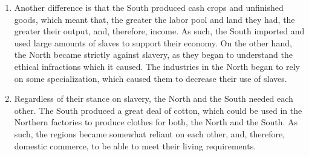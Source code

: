\documentclass[12pt]{article}
\begin{document}
\begin{enumerate}
\begin{enumerate}
      \item Another difference is that the South produced cash crops and unfinished goods, which meant that, the greater the labor pool and land they had, the greater their output, and, therefore, income. As such, the South imported and used large amounts of slaves to support their economy. On the other hand, the North became strictly against slavery, as they began to understand the ethical infractions which it caused. The industries in the North began to rely on some specialization, which caused them to decrease their use of slaves. 

      \item Regardless of their stance on slavery, the North and the South needed each other. The South produced a great deal of cotton, which could be used in the Northern factories to produce clothes for both, the North and the South. As such, the regions became somewhat reliant on each other, and, therefore, domestic commerce, to be able to meet their living requirements.

    \end{enumerate}

\end{enumerate}
\end{document}
